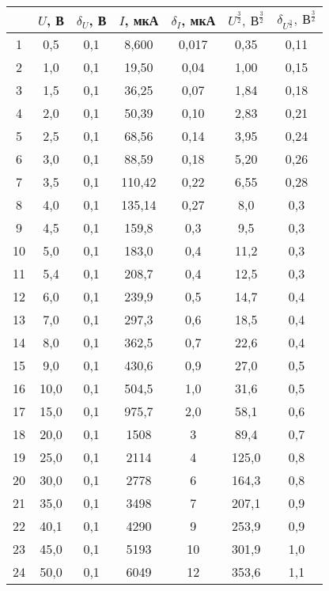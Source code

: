 \begin{table}
\centering
\label{tbl:7}
\begin{tabular}{|c|c|c|c|c|c|c|}
\hline
 & $U$, В & $\delta_U$, В & $I$, мкА & $\delta_I$, мкА & $U^{\frac{3}{2}},\ В^{\frac{3}{2}}$ & $\delta_{U^{\frac{3}{2}}},\ В^{\frac{3}{2}}$ \\
\hline
1 & 0,5 & 0,1 & 8,600 & 0,017 & 0,35 & 0,11 \\
\cline{1-7}
2 & 1,0 & 0,1 & 19,50 & 0,04 & 1,00 & 0,15 \\
\cline{1-7}
3 & 1,5 & 0,1 & 36,25 & 0,07 & 1,84 & 0,18 \\
\cline{1-7}
4 & 2,0 & 0,1 & 50,39 & 0,10 & 2,83 & 0,21 \\
\cline{1-7}
5 & 2,5 & 0,1 & 68,56 & 0,14 & 3,95 & 0,24 \\
\cline{1-7}
6 & 3,0 & 0,1 & 88,59 & 0,18 & 5,20 & 0,26 \\
\cline{1-7}
7 & 3,5 & 0,1 & 110,42 & 0,22 & 6,55 & 0,28 \\
\cline{1-7}
8 & 4,0 & 0,1 & 135,14 & 0,27 & 8,0 & 0,3 \\
\cline{1-7}
9 & 4,5 & 0,1 & 159,8 & 0,3 & 9,5 & 0,3 \\
\cline{1-7}
10 & 5,0 & 0,1 & 183,0 & 0,4 & 11,2 & 0,3 \\
\cline{1-7}
11 & 5,4 & 0,1 & 208,7 & 0,4 & 12,5 & 0,3 \\
\cline{1-7}
12 & 6,0 & 0,1 & 239,9 & 0,5 & 14,7 & 0,4 \\
\cline{1-7}
13 & 7,0 & 0,1 & 297,3 & 0,6 & 18,5 & 0,4 \\
\cline{1-7}
14 & 8,0 & 0,1 & 362,5 & 0,7 & 22,6 & 0,4 \\
\cline{1-7}
15 & 9,0 & 0,1 & 430,6 & 0,9 & 27,0 & 0,5 \\
\cline{1-7}
16 & 10,0 & 0,1 & 504,5 & 1,0 & 31,6 & 0,5 \\
\cline{1-7}
17 & 15,0 & 0,1 & 975,7 & 2,0 & 58,1 & 0,6 \\
\cline{1-7}
18 & 20,0 & 0,1 & 1508 & 3 & 89,4 & 0,7 \\
\cline{1-7}
19 & 25,0 & 0,1 & 2114 & 4 & 125,0 & 0,8 \\
\cline{1-7}
20 & 30,0 & 0,1 & 2778 & 6 & 164,3 & 0,8 \\
\cline{1-7}
21 & 35,0 & 0,1 & 3498 & 7 & 207,1 & 0,9 \\
\cline{1-7}
22 & 40,1 & 0,1 & 4290 & 9 & 253,9 & 0,9 \\
\cline{1-7}
23 & 45,0 & 0,1 & 5193 & 10 & 301,9 & 1,0 \\
\cline{1-7}
24 & 50,0 & 0,1 & 6049 & 12 & 353,6 & 1,1 \\
\cline{1-7}
\hline
\end{tabular}
\end{table}

